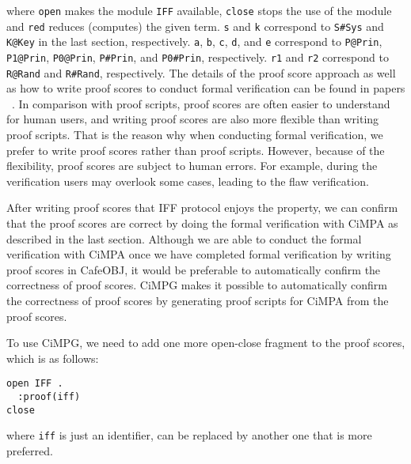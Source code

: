 \documentclass[10pt, conference, compsocconf]{IEEEtran}
\begin{document}
\noindent
where \verb!open! makes the module \verb!IFF! available, \verb!close! stops the use of the module and \verb!red! reduces (computes) the given term. 
\verb!s! and \verb!k! correspond to \verb!S#Sys! and \verb!K@Key! in the last section, respectively.
\verb!a!, \verb!b!, \verb!c!, \verb!d!, and \verb!e! correspond to \verb!P@Prin!, \verb!P1@Prin!, \verb!P0@Prin!, \verb!P#Prin!, and \verb!P0#Prin!, respectively.
\verb!r1! and \verb!r2! correspond to \verb!R@Rand! and \verb!R#Rand!, respectively.
The details of the proof score approach as well as how to write proof scores to conduct formal verification can be found in papers ~\cite{OgataF03fmoods}.
In comparison with proof scripts, proof scores are often easier to understand for human users, and writing proof scores are also more flexible than writing proof scripts.
That is the reason why when conducting formal verification, we prefer to write proof scores rather than proof scripts.
However, because of the flexibility, proof scores are subject to human errors.
For example, during the verification users may overlook some cases, leading to the flaw verification.


After writing proof scores that IFF protocol enjoys the property, we can confirm that the proof scores are correct by doing the formal verification with CiMPA as described in the last
section. Although we are able to conduct the formal verification with
CiMPA once we have completed formal verification by writing proof
scores in CafeOBJ, it would be preferable to automatically confirm the
correctness of proof scores. CiMPG makes it possible to automatically
confirm the correctness of proof scores by generating proof scripts
for CiMPA from the proof scores.

To use CiMPG, we need to add one more open-close fragment to the proof
scores, which is as follows:

\smallskip
\begin{small}
\noindent
\verb!open IFF .!\\
\verb!  :proof(iff)!\\
\verb!close!
\smallskip
\end{small}


\noindent
where \verb!iff! is just an identifier, can be replaced by another one that is more preferred.
\end{document}
